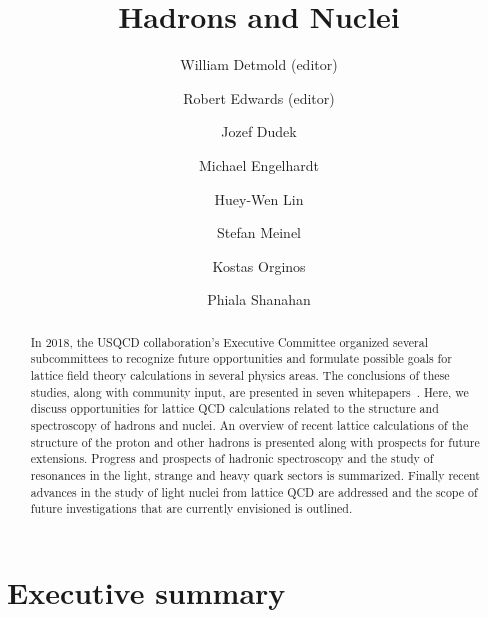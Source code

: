 \documentclass[aps,prd,nofootinbib,floatfix,superscriptaddress,preprint,tightenlines]{revtex4-1}
\begin{document}
\title{Hadrons and Nuclei}
%
\author{William Detmold (editor)}
%
\author{Robert Edwards (editor)}
%
\author{Jozef Dudek}
%
\author{Michael Engelhardt}
%
\author{Huey-Wen Lin}
%
\author{Stefan Meinel}
%
\author{Kostas Orginos}
%
\author{Phiala Shanahan}

\begin{abstract}
In 2018, the USQCD collaboration’s Executive Committee organized several subcommittees to recognize future opportunities and formulate possible goals for lattice field theory calculations in several physics areas.  The conclusions of these studies, along with community input, are presented in seven whitepapers~\cite{wpthermo,wpbsm,wpfund,wpcold,wpcomp,wpneutrino,wphep}.
Here, we discuss opportunities for lattice QCD calculations related to the structure and spectroscopy of hadrons and nuclei. An overview of recent lattice calculations of the structure of the proton and other hadrons is presented along with prospects for future extensions. Progress and prospects of hadronic spectroscopy and the study of resonances in the light, strange and heavy quark sectors is summarized. Finally recent advances in the study of light nuclei from lattice QCD are addressed and the scope of future investigations that are currently envisioned is outlined.
\end{abstract}


%
    

\maketitle

\tableofcontents
\newpage 

\section*{Executive summary}

\end{document}
